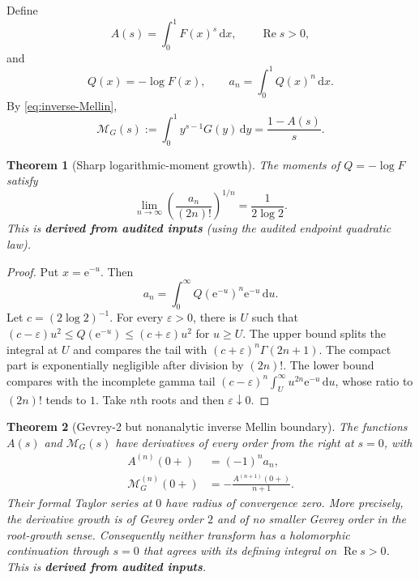 \documentclass[11pt]{article}
\newcommand{\statusderived}{\textcolor{statusblue}{\textbf{derived from audited inputs}}}
\newtheorem{theorem}{Theorem}[section]
\theoremstyle{definition}
\theoremstyle{remark}
\newcommand{\dd}{\,\mathrm d}
\newcommand{\e}{\mathrm e}
\newcommand{\Ree}{\operatorname{Re}}
\newcommand{\Mellin}{\mathcal M}
\begin{document}
Define
\begin{equation}
 A(s)=\int_0^1F(x)^s\dd x,
 \qquad \Ree s>0,
 \label{eq:A-s}
\end{equation}
and
\begin{equation}
 Q(x)=-\log F(x),
 \qquad
 a_n=\int_0^1Q(x)^n\dd x.
 \label{eq:Q-an}
\end{equation}
By \cref{eq:inverse-Mellin},
\begin{equation}
 \Mellin_G(s):=\int_0^1y^{s-1}G(y)\dd y=\frac{1-A(s)}s.
 \label{eq:MG-A}
\end{equation}

\begin{theorem}[Sharp logarithmic-moment growth]
\label{thm:an-growth}
The moments of $Q=-\log F$ satisfy
\begin{equation}
 \boxed{
 \lim_{n\to\infty}
 \left(\frac{a_n}{(2n)!}\right)^{1/n}
 =\frac1{2\log2}.}
 \label{eq:an-growth}
\end{equation}
This is \statusderived{} (using the audited endpoint quadratic law).
\end{theorem}

\begin{proof}
Put $x=\e^{-u}$.  Then
\[
 a_n=\int_0^\infty Q(\e^{-u})^n\e^{-u}\dd u.
\]
Let $c=(2\log2)^{-1}$.  For every $\varepsilon>0$, there is $U$ such that
$(c-\varepsilon)u^2\le Q(\e^{-u})\le(c+\varepsilon)u^2$ for $u\ge U$.
The upper bound splits the integral at $U$ and compares the tail with
$(c+\varepsilon)^n\Gamma(2n+1)$.  The compact part is exponentially negligible after
division by $(2n)!$.  The lower bound compares with the incomplete gamma tail
$(c-\varepsilon)^n\int_U^\infty u^{2n}\e^{-u}\dd u$, whose ratio to $(2n)!$ tends to $1$.
Take $n$th roots and then $\varepsilon\downarrow0$.
\end{proof}

\begin{theorem}[Gevrey-2 but nonanalytic inverse Mellin boundary]
\label{thm:Gevrey-barrier}
The functions $A(s)$ and $\Mellin_G(s)$ have derivatives of every order from the right at
$s=0$, with
\begin{align}
 A^{(n)}(0+)&=(-1)^na_n,\label{eq:A-derivatives-zero}\\
 \Mellin_G^{(n)}(0+)&=-\frac{A^{(n+1)}(0+)}{n+1}.
 \label{eq:MG-derivatives-zero}
\end{align}
Their formal Taylor series at $0$ have radius of convergence zero.  More precisely, the
derivative growth is of Gevrey order $2$ and of no smaller Gevrey order in the root-growth
sense.  Consequently neither transform has a holomorphic continuation through $s=0$ that
agrees with its defining integral on $\Ree s>0$.  This is \statusderived.
\end{theorem}
\end{document}
